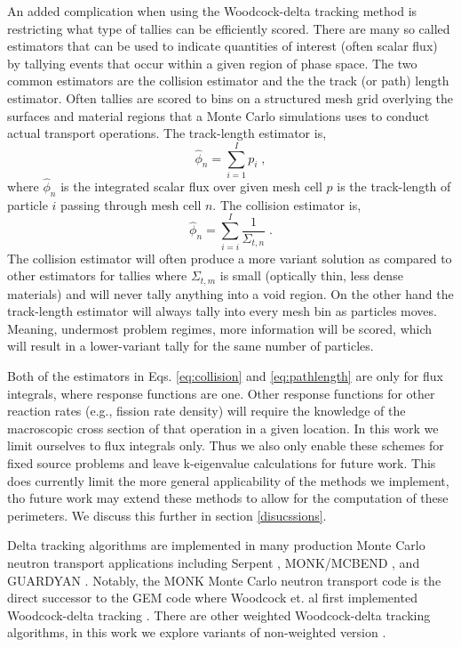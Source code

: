 An added complication when using the Woodcock-delta tracking method is restricting what type of tallies can be efficiently scored.
There are many so called estimators that can be used to indicate quantities of interest (often scalar flux) by tallying events that occur within a given region of phase space.
The two common estimators are the collision estimator and the the track (or path) length estimator.
Often tallies are scored to bins on a structured mesh grid overlying the surfaces and material regions that a Monte Carlo simulations uses to conduct actual transport operations.
The track-length estimator is,
\begin{equation}
    \label{eq:pathlength}
    \hat{\phi}_n = \sum_{i=1}^{I}p_i \; ,
\end{equation}
where $\hat{\phi}_n$ is the integrated scalar flux over given mesh cell $p$ is the track-length of particle $i$ passing through mesh cell $n$.
The collision estimator is,
\begin{equation}
    \label{eq:collision}
    \hat{\phi}_n = \sum_{i=i}^{I} \frac{1}{\Sigma_{t,n}} \;.
\end{equation}
The collision estimator will often produce a more variant solution as compared to other estimators for tallies where $\Sigma_{t,m}$ is small (optically thin, less dense materials) and will never tally anything into a void region.
On the other hand the track-length estimator will always tally into every mesh bin as particles moves.
Meaning, undermost problem regimes, more information will be scored, which will result in a lower-variant tally for the same number of particles.

Both of the estimators in Eqs. \ref{eq:collision} and \ref{eq:pathlength} are only for flux integrals, where response functions are one.
Other response functions for other reaction rates (e.g., fission rate density) will require the knowledge of the macroscopic cross section of that operation in a given location.
In this work we limit ourselves to flux integrals only.
Thus we also only enable these schemes for fixed source problems and leave k-eigenvalue calculations for future work.
This does currently limit the more general applicability of the methods we implement, tho future work may extend these methods to allow for the computation of these perimeters.
We discuss this further in section \ref{disucssions}.

Delta tracking algorithms are implemented in many production Monte Carlo neutron transport applications including Serpent \cite{leppanen_2010_burnup, leppanen_use_2017, leppanen_development_2013, leppanen_2015_serpent}, MONK/MCBEND \cite{richards_monk_2015}, and GUARDYAN \cite{molnar_gpu_based_2019}.
Notably, the MONK Monte Carlo neutron transport code is the direct successor to the GEM code where Woodcock et. al first implemented Woodcock-delta tracking \cite{woodcock_techniques_1965}.
There are other weighted Woodcock-delta tracking algorithms, in this work we explore variants of non-weighted version \cite{molnar_variance_2018, morgan_weighted-delta-tracking_2015}.

